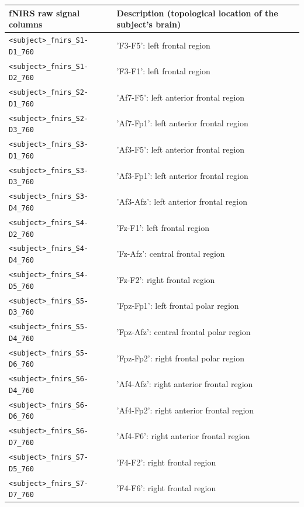 \begin{table}
  \centering
  \begin{tabularx}{\textwidth}{|l|X|}
  \hline
  \textbf{fNIRS raw signal columns} & \textbf{Description (topological location of the subject's brain)} \\
  \hline
  \texttt{<subject>\_fnirs\_S1-D1\_760} & 'F3-F5': left frontal region \\
  \hline
  \texttt{<subject>\_fnirs\_S1-D2\_760} & 'F3-F1': left frontal region  \\
  \hline
  \texttt{<subject>\_fnirs\_S2-D1\_760} & 'Af7-F5': left anterior frontal region  \\
  \hline
  \texttt{<subject>\_fnirs\_S2-D3\_760} & 'Af7-Fp1': left anterior frontal region  \\
  \hline
  \texttt{<subject>\_fnirs\_S3-D1\_760} & 'Af3-F5': left anterior frontal region  \\
  \hline
  \texttt{<subject>\_fnirs\_S3-D3\_760} & 'Af3-Fp1': left anterior frontal region  \\
  \hline
  \texttt{<subject>\_fnirs\_S3-D4\_760} & 'Af3-Afz': left anterior frontal region  \\
  \hline
  \texttt{<subject>\_fnirs\_S4-D2\_760} & 'Fz-F1': left frontal region  \\
  \hline
  \texttt{<subject>\_fnirs\_S4-D4\_760} & 'Fz-Afz': central frontal region  \\
  \hline
  \texttt{<subject>\_fnirs\_S4-D5\_760} & 'Fz-F2': right frontal region  \\
  \hline
  \texttt{<subject>\_fnirs\_S5-D3\_760} & 'Fpz-Fp1': left frontal polar region  \\
  \hline
  \texttt{<subject>\_fnirs\_S5-D4\_760} & 'Fpz-Afz': central frontal polar region  \\
  \hline
  \texttt{<subject>\_fnirs\_S5-D6\_760} & 'Fpz-Fp2': right frontal polar region  \\
  \hline
  \texttt{<subject>\_fnirs\_S6-D4\_760} & 'Af4-Afz': right anterior frontal region  \\
  \hline
  \texttt{<subject>\_fnirs\_S6-D6\_760} & 'Af4-Fp2': right anterior frontal region  \\
  \hline
  \texttt{<subject>\_fnirs\_S6-D7\_760} & 'Af4-F6': right anterior frontal region  \\
  \hline
  \texttt{<subject>\_fnirs\_S7-D5\_760} & 'F4-F2': right frontal region  \\
  \hline
  \texttt{<subject>\_fnirs\_S7-D7\_760} & 'F4-F6': right frontal region  \\

\end{tabularx}
\end{table}
